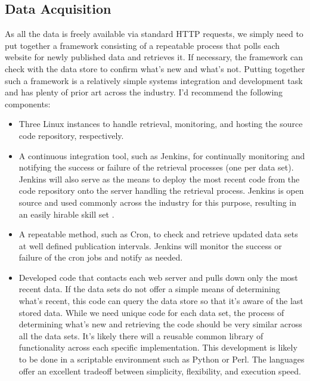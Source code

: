 \subsection*{Data Acquisition}
As all the data is freely available via standard HTTP requests, we simply need to put together a framework consisting of a repeatable process that polls each website for newly published data and retrieves it. If necessary, the framework can check with the data store to confirm what's new and what's not. Putting together such a framework is a relatively simple systems integration and development task and has plenty of prior art across the industry. I'd recommend the following components:
\begin{itemize}
	\item Three Linux instances to handle retrieval, monitoring, and hosting the source code repository, respectively.
	\item A continuous integration tool, such as Jenkins, for continually monitoring and notifying the success or failure of the retrieval processes (one per data set). Jenkins will also serve as the means to deploy the most recent code from the code repository onto the server handling the retrieval process. Jenkins is open source and used commonly across the industry for this purpose, resulting in an easily hirable skill set \cite{jenkins}.
	\item A repeatable method, such as Cron, to check and retrieve updated data sets at well defined publication intervals. Jenkins will monitor the success or failure of the cron jobs and notify as needed.
	\item Developed code that contacts each web server and pulls down only the most recent data. If the data sets do not offer a simple means of determining what's recent, this code can query the data store so that it's aware of the last stored data. While we need unique code for each data set, the process of determining what's new and retrieving the code should be very similar across all the data sets. It's likely there will a reusable common library of functionality across each specific implementation. This development is likely to be done in a scriptable environment such as Python or Perl. The languages offer an excellent tradeoff between simplicity, flexibility, and execution speed.
\end{itemize}

